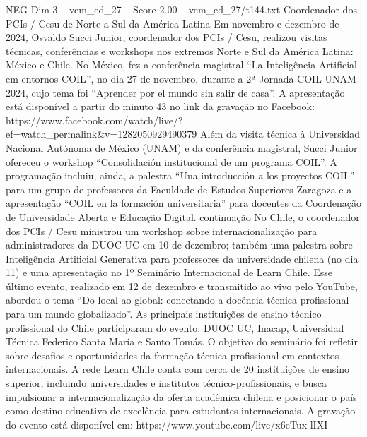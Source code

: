 \begin{textsample}{NEG Dim 3 – vem\_ed\_27 – Score 2.00 – vem\_ed\_27/t144.txt}  \label{ex:f3_neg_181}
Coordenador dos PCIs / Cesu de Norte a Sul da América Latina Em novembro e dezembro de 2024, Osvaldo Succi Junior, coordenador dos PCIs / Cesu, realizou visitas técnicas, conferências e workshops nos extremos Norte e Sul da América Latina: México e Chile.
No México, fez a conferência magistral “La Inteligência Artificial em entornos COIL”, no dia 27 de novembro, durante a 2ª Jornada COIL UNAM 2024, cujo tema foi “Aprender por el mundo sin salir de casa”.
A apresentação está disponível a partir do minuto 43 no link da gravação no Facebook: https://www.facebook.com/watch/live/?ef=watch\_permalink\&v=1282050929490379 Além da visita técnica à Universidad Nacional Autónoma de México (UNAM) e da conferência magistral, Succi Junior ofereceu o workshop “Consolidación institucional de um programa COIL”.
A programação incluiu, ainda, a palestra “Una introducción a los proyectos COIL” para um grupo de professores da Faculdade de Estudos Superiores Zaragoza e a apresentação “COIL en la formación universitaria” para docentes da Coordenação de Universidade Aberta e Educação Digital. continuação No Chile, o coordenador dos PCIs / Cesu ministrou um workshop sobre internacionalização para administradores da DUOC UC em 10 de dezembro; também uma palestra sobre Inteligência Artificial Generativa para professores da universidade chilena (no dia 11) e uma apresentação no 1º Seminário Internacional de Learn Chile.
Esse último evento, realizado em 12 de dezembro e transmitido ao vivo pelo YouTube, abordou o tema “Do local ao global: conectando a docência técnica profissional para um mundo globalizado”.
As principais instituições de ensino técnico profissional do Chile participaram do evento: DUOC UC, Inacap, Universidad Técnica Federico Santa María e Santo Tomás.
O objetivo do seminário foi refletir sobre desafios e oportunidades da formação técnica-profissional em contextos internacionais.
A rede Learn Chile conta com cerca de 20 instituições de ensino superior, incluindo universidades e institutos técnico-profissionais, e busca impulsionar a internacionalização da oferta acadêmica chilena e posicionar o país como destino educativo de excelência para estudantes internacionais.
A gravação do evento está disponível em: https://www.youtube.com/live/x6eTux-lIXI

\end{textsample}
